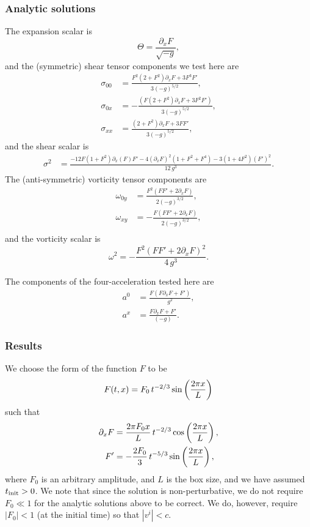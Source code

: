 \documentclass[a4paper]{article}
\newcommand{\pd}{\partial}
\begin{document}
\subsubsection{Analytic solutions}

The expansion scalar is
\begin{equation}
	\Theta = \frac{\pd_x F}{\sqrt{-g}},
\end{equation}
and the (symmetric) shear tensor components we test here are
\begin{align}
	\sigma_{00} &= \frac{F^2 (2+F^2) \pd_x F + 3 F^3 F'}{3(-g)^{5/2}}, \\
	\sigma_{0x} &= - \frac{(F (2+F^2) \pd_x F + 3 F^2 F')}{3(-g)^{5/2}}, \\
	\sigma_{xx} &= \frac{(2+F^2) \pd_x F + 3 F F'}{3(-g)^{5/2}},
\end{align}
and the shear scalar is
\begin{align}
	\sigma^2 &= \frac{-12 F (1 + F^2) \pd_x(F) F' - 4 (\pd_x F)^2 (1 + F^2 + F^4) - 3(1+4F^2) (F')^2}{12\, g^3}.
\end{align}
The (anti-symmetric) vorticity tensor components are
\begin{align}
	\omega_{0y} &= \frac{F^2 (F F' + 2\pd_x F)}{2(-g)^{3/2}}, \\
	\omega_{xy} &= -\frac{F (F F' + 2\pd_x F)}{2(-g)^{3/2}}, \\
\end{align}
and the vorticity scalar is
\begin{equation}
	\omega^2 = - \frac{F^2 ( FF' + 2 \pd_x F)^2}{4 \, g^3}.
\end{equation}

The components of the four-acceleration tested here are
\begin{align}
	a^0 &= \frac{F(F\pd_x F + F')}{g^2}, \\
	a^x &= \frac{F \pd_x F + F'}{(-g)}.
\end{align}	


\subsubsection{Results}

We choose the form of the function $F$ to be
\begin{equation}
	F(t,x) = F_0 \, t^{-2/3} \, {\rm sin}\left(\frac{2 \pi x}{L}\right)
\end{equation}
such that
\begin{align}
	\pd_x F &= \frac{2 \pi F_0 x}{L} \, t^{-2/3} \, {\rm cos}\left(\frac{2 \pi x}{L}\right), \\
		      F' &= -\frac{2 F_0}{3} \, t^{-5/3} \, {\rm sin}\left(\frac{2 \pi x}{L}\right),
\end{align}
where $F_0$ is an arbitrary amplitude, and $L$ is the box size, and we have assumed $t_{\rm init}>0$. We note that since the solution is non-perturbative, we do not require $F_0\ll 1$ for the analytic solutions above to be correct. We do, however, require $|F_0|<1$ (at the initial time) so that $|v^i| < c$.
\end{document}
